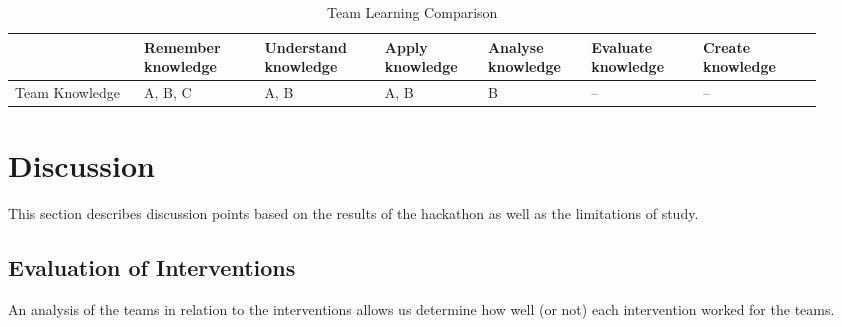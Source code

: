\documentclass[runningheads]{llncs}
\begin{document}
\begin{table}[h]
    \caption{Team Learning Comparison}
    \label{tab:bloomteamcomp}
    \centering
    \begin{tabular}{|p{0.15\linewidth}|p{0.14\linewidth}|p{0.14\linewidth}|p{0.12\linewidth}|p{0.12\linewidth}|p{0.13\linewidth}|p{0.14\linewidth}|}
    \hline
	 & Remember knowledge & Understand knowledge & Apply knowledge & Analyse knowledge & Evaluate knowledge & Create knowledge\\ \hline
	Team \newline Knowledge & A, B, C & A, B & A, B & B & -- & -- \\ \hline
    \end{tabular}
\end{table}


\section{Discussion}
This section describes discussion points based on the results of the hackathon as well as the limitations of study.

\subsection{Evaluation of Interventions} \label{evalintervention}
An analysis of the teams in relation to the interventions allows us determine how well (or not) each intervention worked for the teams.
\end{document}
